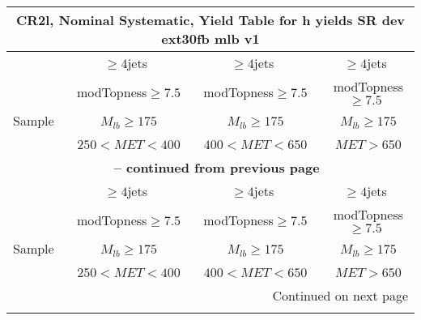 \documentclass{article}
\begin{document}
\begin{longtable}{|l|c|c|c|} 
 
\multicolumn{4}{c}{ CR2l, Nominal Systematic, Yield Table for h yields SR dev ext30fb mlb v1 }\\* \hline 
  & $\ge4$jets  & $\ge4$jets  & $\ge4$jets \\* 
  & ~modTopness$\ge7.5$  & ~modTopness$\ge7.5$  & ~modTopness$\ge7.5$ \\* 
Sample  & ~$M_{lb}\ge175$  & ~$M_{lb}\ge175$  & ~$M_{lb}\ge175$ \\* 
  & ~$250<MET<400$  & ~$400<MET<650$  & ~$MET>650$ \\* 
\hline \hline 
\endfirsthead 
 
\multicolumn{4}{c}{{\bfseries \tablename\ \thetable{} -- continued from previous page}}\\* \hline 
  & $\ge4$jets  & $\ge4$jets  & $\ge4$jets \\* 
  & ~modTopness$\ge7.5$  & ~modTopness$\ge7.5$  & ~modTopness$\ge7.5$ \\* 
Sample  & ~$M_{lb}\ge175$  & ~$M_{lb}\ge175$  & ~$M_{lb}\ge175$ \\* 
  & ~$250<MET<400$  & ~$400<MET<650$  & ~$MET>650$ \\* 
\hline \hline 
\endhead 
 
\multicolumn{4}{|r|}{{Continued on next page}}\\* \hline 
\endfoot 
 
 
\endlastfoot 
 

\end{longtable}
\end{document}
